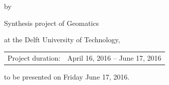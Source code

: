 \begin{titlepage}


\begin{center}


{\makeatletter
\largetitlestyle\fontsize{64}{94}\selectfont\@title
\makeatother}

{\makeatletter
\ifx\@subtitle\undefined\else
    \bigskip
   {\tudsffamily\fontsize{22}{32}\selectfont\@subtitle}    
\fi
\makeatother}

\bigskip
\bigskip

by

\bigskip
\bigskip

{\makeatletter
\largetitlestyle\fontsize{26}{26}\selectfont\@author
\makeatother}

\bigskip
\bigskip

{\fontsize{15}{0.2}\selectfont Synthesis project of Geomatics

at the Delft University of Technology,}

\vfill

\begin{tabular}{lll}
    Project duration: & \multicolumn{2}{l}{April 16, 2016 -- June 17, 2016} \\
\end{tabular}

\bigskip
\bigskip
\bigskip
\bigskip
to be presented on Friday June 17, 2016.
\end{center}


\end{titlepage}

